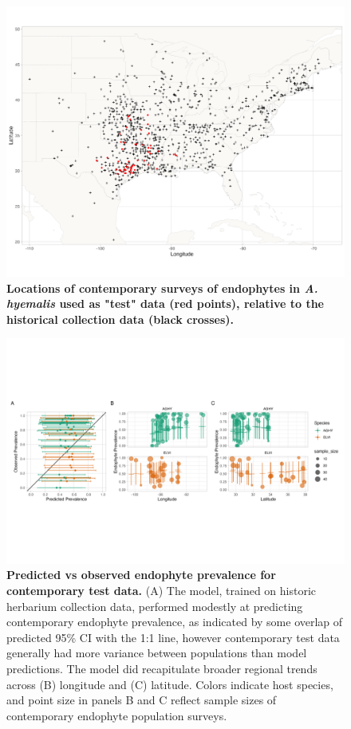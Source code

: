 \documentclass[11pt]{article}
\begin{document}
\begin{figure}[H]
	\centering
	\includegraphics[width = \linewidth]{test_data_map.png}
	\caption{\textbf{Locations of contemporary surveys of endophytes in \emph{A. hyemalis} used as "test" data (red points), relative to the historical collection data (black crosses).}}
\end{figure}


\begin{figure}[H]
	\centering
	\includegraphics[width = \linewidth]{contemp_test_plot.png}
	\caption{\textbf{Predicted vs observed endophyte prevalence for contemporary test data.} (A) The model, trained on historic herbarium collection data, performed modestly at predicting contemporary endophyte prevalence, as indicated by some overlap of predicted 95\% CI with the 1:1 line, however contemporary test data generally had more variance between populations than model predictions. The model did recapitulate broader regional trends across (B) longitude and (C) latitude. Colors indicate host species, and point size in panels B and C reflect sample sizes of contemporary endophyte population surveys.}
\end{figure}
\end{document}
